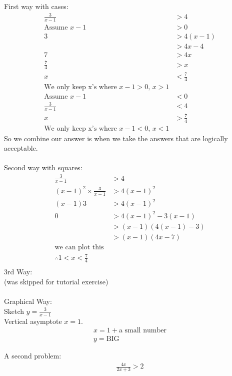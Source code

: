 First way with cases:
\begin{align}
  \frac{3}{x-1} & > 4 \\
  \text{Assume } x-1 & > 0 \\
  3 & > 4(x-1) \\
    & > 4x - 4 \\
  7 & > 4x \\
  \frac{7}{4} & > x \\
  x & < \frac{7}{4} \\
  \text{We only keep x's where $x-1 > 0$, $x > 1$} \nonumber \\
  \text{Assume } x-1 & < 0 \\
  \frac{3}{x-1} & < 4 \\
  x & > \frac{7}{4} \\
  \text{We only keep x's where $x-1 < 0$, $x < 1$} \nonumber
\end{align}
So we combine our answer is when we take the answers that are logically
acceptable.\\
\\
Second way with squares:
\begin{align}
  \frac{3}{x-1} & > 4 \\
  (x-1)^2 \times \frac{3}{x-1} & > 4 (x-1)^2 \\
  (x-1)3 & > 4(x-1)^2 \\
  0 & > 4(x-1)^2 - 3(x-1) \\
    & > (x-1)(4(x-1) - 3) \\
    & > (x-1)(4x - 7) \\
\text{we can plot this} \\
 \therefore 1 < x < \frac{7}{4} \\
\end{align}
3rd Way: \\
(was skipped for tutorial exercise) \\
\\
Graphical Way: \\
Sketch $y = \frac{3}{x-1}$ \\
Vertical asymptote $x = 1$.
\begin{align}
  x = 1 + \text{a small number} \\
  y = \text{BIG}
\end{align}


A second problem:
\begin{align}
  \frac{4x}{2x+3} > 2 \\
\end{align}

